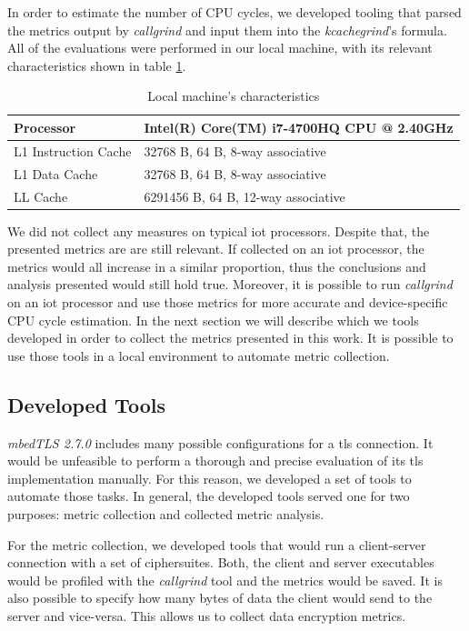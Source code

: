 \documentclass{llncs}
\begin{document}
In order to estimate the number of CPU cycles, we developed tooling that parsed the metrics output by
\textit{callgrind} and input them into the \textit{kcachegrind}'s formula. All of the evaluations were performed in
our local machine, with its relevant characteristics shown in table \ref{table:local-machine}.

\begin{table}[]
\begin{tabular}{|l|l|}
\hline
Processor            & Intel(R) Core(TM) i7-4700HQ CPU @ 2.40GHz \\ \hline
L1 Instruction Cache & 32768 B, 64 B, 8-way associative          \\ \hline
L1 Data Cache        & 32768 B, 64 B, 8-way associative          \\ \hline
LL Cache             & 6291456 B, 64 B, 12-way associative       \\ \hline
\end{tabular}
\centering \caption{\label{table:local-machine} Local machine's characteristics}
\end{table}

We did not collect any measures on typical \gls{iot} processors. Despite that, the presented metrics are are still
relevant. If collected on an \gls{iot} processor, the metrics would all increase in a similar proportion, thus
the conclusions and analysis presented would still hold true. Moreover, it is possible to run \textit{callgrind}
on an \gls{iot} processor and use those metrics for more accurate and device-specific CPU cycle estimation.
In the next section we will describe which we tools developed in order to collect the metrics presented in this work.
It is possible to use those tools in a local environment to automate metric collection.

\subsection{Developed Tools}

\textit{mbedTLS 2.7.0} includes many possible configurations for a \gls{tls} connection. It would be unfeasible to
perform a thorough and precise evaluation of its \gls{tls} implementation manually. For this reason, we developed a set
of tools to automate those tasks. In general, the developed tools served one for two purposes: metric collection and
collected metric analysis.

For the metric collection, we developed tools that would run a client-server connection with a set of ciphersuites.
Both, the client and server executables would be profiled with the \textit{callgrind} tool and the metrics would be saved.
It is also possible to specify how many bytes of data the client would send to the server and vice-versa.
This allows us to collect data encryption metrics.
\end{document}
